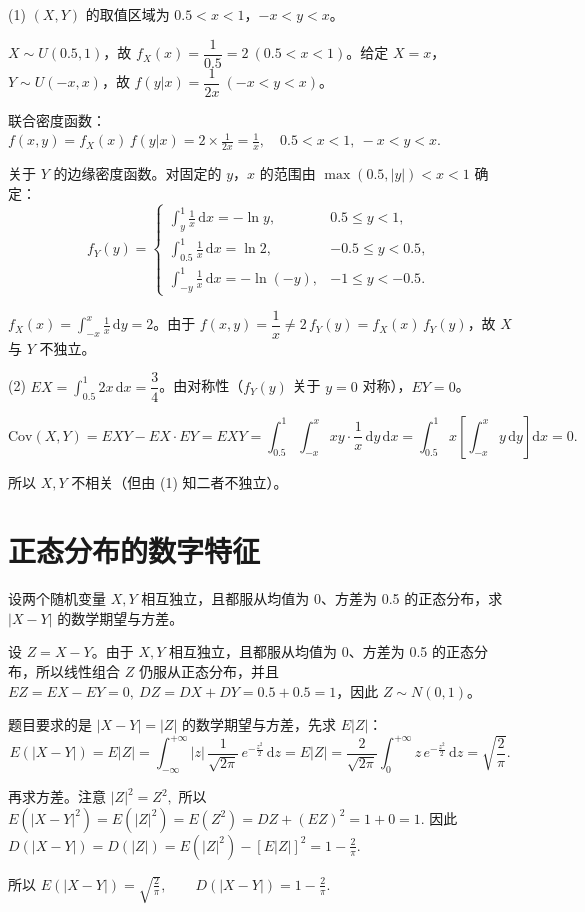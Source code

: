 \documentclass[lang=cn,11pt]{elegantbook}
\begin{document}
\begin{solution}
(1) \((X,Y)\) 的取值区域为 \(0.5 < x < 1\)，\(-x < y < x\)。

\(X \sim U(0.5, 1)\)，故 \(f_X(x) = \dfrac{1}{0.5} = 2\ (0.5 < x < 1)\)。给定 \(X = x\)，\(Y \sim U(-x, x)\)，故 \(f(y|x) = \dfrac{1}{2x}\ (-x < y < x)\)。

联合密度函数：
\(
f(x,y) = f_X(x)\,f(y|x) = 2 \times \frac{1}{2x} = \frac{1}{x},\quad 0.5 < x < 1,\ -x < y < x.
\)

关于 \(Y\) 的边缘密度函数。对固定的 \(y\)，\(x\) 的范围由 \(\max(0.5, |y|) < x < 1\) 确定：
\[
f_Y(y) = \begin{cases}
\displaystyle\int_y^1 \frac{1}{x}\,\mathrm{d}x = -\ln y, & 0.5 \leqslant y < 1, \\[8pt]
\displaystyle\int_{0.5}^1 \frac{1}{x}\,\mathrm{d}x = \ln 2, & -0.5 \leqslant y < 0.5, \\[8pt]
\displaystyle\int_{-y}^1 \frac{1}{x}\,\mathrm{d}x = -\ln(-y), & -1 \leqslant y < -0.5.
\end{cases}
\]

\(f_X(x) = \displaystyle\int_{-x}^{x} \frac{1}{x}\,\mathrm{d}y = 2\)。由于 \(f(x,y) = \dfrac{1}{x} \neq 2\,f_Y(y) = f_X(x)\,f_Y(y)\)，故 \(X\) 与 \(Y\) 不独立。

(2) \(EX = \displaystyle\int_{0.5}^{1} 2x\,\mathrm{d}x = \dfrac{3}{4}\)。由对称性（\(f_Y(y)\) 关于 \(y = 0\) 对称），\(EY = 0\)。

\[
\mathrm{Cov}(X,Y) = EXY - EX \cdot EY = EXY = \int_{0.5}^{1}\int_{-x}^{x} xy \cdot \frac{1}{x}\,\mathrm{d}y\,\mathrm{d}x = \int_{0.5}^{1} x\!\left[\int_{-x}^{x} y\,\mathrm{d}y\right]\mathrm{d}x = 0.
\]

所以 \(X, Y\) 不相关（但由 (1) 知二者不独立）。
\end{solution}

\section{正态分布的数字特征}



\begin{exercise}\label{exer:4-15-absnormal}
设两个随机变量 \(X, Y\) 相互独立，且都服从均值为 0、方差为 0.5 的正态分布，求 \(|X-Y|\) 的数学期望与方差。
\end{exercise}

\begin{solution}
设 \(Z=X-Y\)。由于 \(X,Y\) 相互独立，且都服从均值为 0、方差为 0.5 的正态分布，所以线性组合 \(Z\) 仍服从正态分布，并且 \(EZ=EX-EY=0,\ DZ=DX+DY=0.5+0.5=1\)，因此 \(Z\sim N(0,1)\)。

题目要求的是 \(|X-Y|=|Z|\) 的数学期望与方差，先求 \(E|Z|\)：
\[
E(|X-Y|)=E|Z|=\int_{-\infty}^{+\infty}|z|\,\frac{1}{\sqrt{2\pi}}\,e^{-\frac{z^2}{2}}\,\mathrm{d}z=
E|Z|=\frac{2}{\sqrt{2\pi}}\int_0^{+\infty} z\,e^{-\frac{z^2}{2}}\,\mathrm{d}z
=\sqrt{\frac{2}{\pi}}.
\]

再求方差。注意
\(
|Z|^2=Z^2,
\)
所以
\(
E(|X-Y|^2)=E(|Z|^2)=E(Z^2)=DZ+(EZ)^2=1+0=1.
\)
因此
\(
D(|X-Y|)=D(|Z|)=E(|Z|^2)-[E|Z|]^2=1-\frac{2}{\pi}.
\)

所以
\(
E(|X-Y|)=\sqrt{\frac{2}{\pi}},\qquad D(|X-Y|)=1-\frac{2}{\pi}.
\)
\end{solution}
\end{document}
